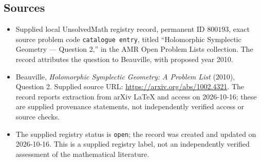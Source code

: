 \documentclass[11pt]{article}
\begin{document}
\subsection{Sources}
\begin{itemize}
\item Supplied local UnsolvedMath registry record, permanent ID \(800193\), exact source problem code \texttt{catalogue entry}, titled ``Holomorphic Symplectic Geometry --- Question 2,'' in the AMR Open Problem Lists collection. The record attributes the question to Beauville, with proposed year 2010.
\item Beauville, \emph{Holomorphic Symplectic Geometry: A Problem List} (2010), Question 2. Supplied source URL: \url{https://arxiv.org/abs/1002.4321}. The record reports extraction from arXiv LaTeX and access on 2026-10-16; these are supplied provenance statements, not independently verified access or source checks.
\item The supplied registry status is \texttt{open}; the record was created and updated on 2026-10-16. This is a supplied registry label, not an independently verified assessment of the mathematical literature.
\end{itemize}
\end{document}
